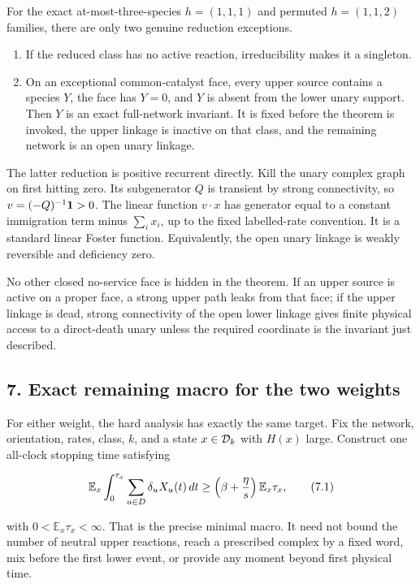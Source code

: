For the exact at-most-three-species \(h=(1,1,1)\) and permuted
\(h=(1,1,2)\) families, there are only two genuine reduction exceptions.

\begin{enumerate}
\def\labelenumi{\arabic{enumi}.}
\tightlist
\item
  If the reduced class has no active reaction, irreducibility makes it a
  singleton.
\item
  On an exceptional common-catalyst face, every upper source contains a
  species \(Y\), the face has \(Y=0\), and \(Y\) is absent from the
  lower unary support. Then \(Y\) is an exact full-network invariant. It
  is fixed before the theorem is invoked, the upper linkage is inactive
  on that class, and the remaining network is an open unary linkage.
\end{enumerate}

The latter reduction is positive recurrent directly. Kill the unary
complex graph on first hitting zero. Its subgenerator \(Q\) is transient
by strong connectivity, so \(v=(-Q)^{-1}{\bf1}>0\). The linear function
\(v\cdot x\) has generator equal to a constant immigration term minus
\(\sum_i x_i\), up to the fixed labelled-rate convention. It is a
standard linear Foster function. Equivalently, the open unary linkage is
weakly reversible and deficiency zero.

No other closed no-service face is hidden in the theorem. If an upper
source is active on a proper face, a strong upper path leaks from that
face; if the upper linkage is dead, strong connectivity of the open
lower linkage gives finite physical access to a direct-death unary
unless the required coordinate is the invariant just described.

\subsection{7. Exact remaining macro for the two
weights}

For either weight, the hard analysis has exactly the same target. Fix
the network, orientation, rates, class, \(k\), and a state
\(x\in{\cal D}_k\) with \(H(x)\) large. Construct one all-clock stopping
time satisfying

\[
 {\mathbb E}_x\int_0^{\tau_x}
       \sum_{u\in D}\delta_uX_u(t)\,dt
 \ge\left(\beta+{\eta\over s}\right){\mathbb E}_x\tau_x,             \tag{7.1}
\]

with \(0<{\mathbb E}_x\tau_x<\infty\). That is the precise minimal
macro. It need not bound the number of neutral upper reactions, reach a
prescribed complex by a fixed word, mix before the first lower event, or
provide any moment beyond first physical time.

